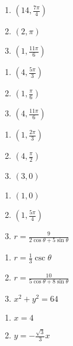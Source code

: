 \begin{multicols}{3}
\begin{enumerate}	\setcounter{enumi}{\value{Review}}
    \item $\left(14, \frac{7\pi}{4}\right)$
    \item $(2, \pi)$	
    \item $\left(1, \frac{11\pi}{6}\right)$
\end{enumerate}	\setcounter{Review}{\value{enumi}}
\end{multicols}
\begin{multicols}{3}
\begin{enumerate}	\setcounter{enumi}{\value{Review}}
    \item $\left(4, \frac{5\pi}{3}\right)$
    \item $\left(1, \frac{\pi}{6}\right)$
    \item $\left(4, \frac{11\pi}{6}\right)$
\end{enumerate}	\setcounter{Review}{\value{enumi}}
\end{multicols}
\begin{multicols}{3}
\begin{enumerate}	\setcounter{enumi}{\value{Review}}
    \item $\left(1, \frac{2\pi}{3}\right)$
    \item $\left(4, \frac{\pi}{2}\right)$
    \item $(3,0)$	
\end{enumerate}	\setcounter{Review}{\value{enumi}}
\end{multicols}
\begin{multicols}{3}
\begin{enumerate}	\setcounter{enumi}{\value{Review}}
    \item $(1,0)$	
  	\item $\left(1, \frac{5\pi}{4}\right)$
    \item $r = \frac{9}{2\cos\theta+5\sin\theta}$
\end{enumerate}	\setcounter{Review}{\value{enumi}}
\end{multicols}
\begin{multicols}{3}
\begin{enumerate}	\setcounter{enumi}{\value{Review}}
    \item $r = \frac{1}{3}\csc\theta$	
    \item $r = \frac{10}{5\cos\theta+8\sin\theta}$
    \item $x^2+y^2=64$	
\end{enumerate}	\setcounter{Review}{\value{enumi}}
\end{multicols}
\begin{multicols}{3}
\begin{enumerate}	\setcounter{enumi}{\value{Review}}
    \item $x = 4$	
    \item $y = -\frac{\sqrt{3}}{3}x$
\end{enumerate}
\end{multicols}